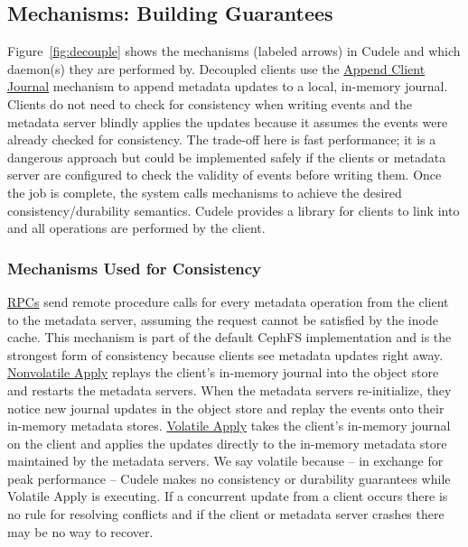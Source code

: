 \subsection{Mechanisms: Building Guarantees}
\label{sec:the-cudelesfs-mechanisms}

Figure~\ref{fig:decouple} shows the mechanisms (labeled arrows) in Cudele and
which daemon(s) they are performed by.   Decoupled clients use the
\underline{Append Client Journal} mechanism to append metadata updates to a
local, in-memory journal. Clients do not need to check for
consistency when writing events and the metadata server blindly applies the
updates because it assumes the events were already checked for consistency. The
trade-off here is fast performance; it is a dangerous approach but could be
implemented safely if the clients or metadata server are configured to check
the validity of events before writing them.  Once the job is complete, the
system calls mechanisms to achieve the desired consistency/durability
semantics.  Cudele provides a library for clients to link into and all
operations are performed by the client.  

\subsubsection{Mechanisms Used for Consistency} \underline{RPCs} send remote
procedure calls for every metadata operation from the client to the metadata
server, assuming the request cannot be satisfied by the inode cache. This
mechanism is part of the default CephFS implementation and is the strongest
form of consistency because clients see metadata updates right away.
\underline{Nonvolatile Apply} replays the client's in-memory journal into the
object store and restarts the metadata servers. When the metadata servers
re-initialize, they notice new journal updates in the object store and replay
the events onto their in-memory metadata stores.  \underline{Volatile Apply}
takes the client's in-memory journal on the client and applies the updates
directly to the in-memory metadata store maintained by the metadata servers. We
say volatile because -- in exchange for peak performance -- Cudele makes no
consistency or durability guarantees while Volatile Apply is executing.  If a
concurrent update from a client occurs there is no rule for resolving conflicts
and if the client or metadata server crashes there may be no way to recover.

